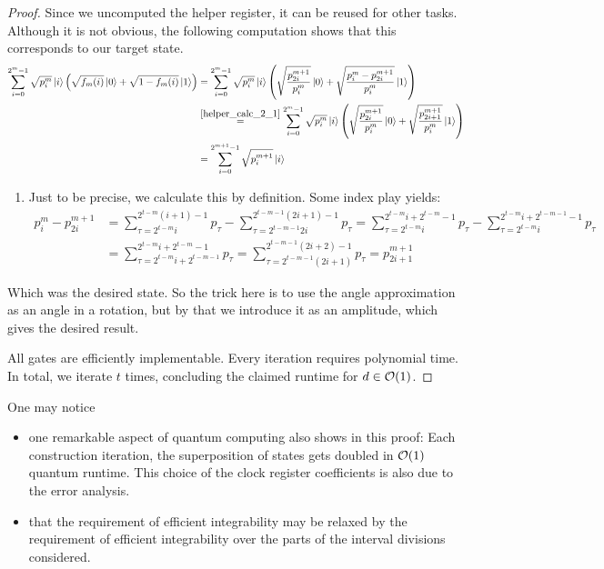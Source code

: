 \begin{proof}
    Since we uncomputed the helper register, it can be reused for other tasks. Although it is not obvious, the following computation shows that this corresponds to our target state.
    \begin{align}
        \sum_{i=0}^{2^m-1}\sqrt{p_i^m}\ket{i}\left(\sqrt{f_m(i)}\ket{0}+\sqrt{1-f_m(i)}\ket{1}\right) &= \sum_{i=0}^{2^m-1}\sqrt{p_i^m}\ket{i}\left(\sqrt{\frac{p_{2i}^{m+1}}{p_i^m}}\ket{0}+\sqrt{\frac{p_i^m-p_{2i}^{m+1}}{p_i^m}}\ket{1}\right)\\
        &\overset{\ref{helper_calc_2_1}}{=} \sum_{i=0}^{2^m-1}\sqrt{p_i^m}\ket{i}\left(\sqrt{\frac{p_{2i}^{m+1}}{p_i^m}}\ket{0}+\sqrt{\frac{p_{2i+1}^{m+1}}{p_i^m}}\ket{1}\right)\\
        &= \sum_{i=0}^{2^{m+1}-1}\sqrt{p_i^{m+1}}\ket{i}
    \end{align}
    \begin{enumerate}[label=(\arabic*)]
        \item \label{helper_calc_2_1} Just to be precise, we calculate this by definition. Some index play yields:
        \begin{align}
            p_i^m-p_{2i}^{m+1} &= \textstyle\sum_{\tau=2^{t-m}i}^{2^{t-m}(i+1)-1} p_\tau - \textstyle\sum_{\tau=2^{t-m-1}2i}^{2^{t-m-1}(2i+1)-1} p_\tau = \textstyle\sum_{\tau=2^{t-m}i}^{2^{t-m}i+2^{t-m}-1} p_\tau - \textstyle\sum_{\tau=2^{t-m}i}^{2^{t-m}i+2^{t-m-1}-1} p_\tau\\
            &= \textstyle\sum_{\tau=2^{t-m}i+2^{t-m-1}}^{2^{t-m}i+2^{t-m}-1} p_\tau = \textstyle\sum_{\tau=2^{t-m-1}(2i+1)}^{2^{t-m-1}(2i+2)-1} p_\tau = p_{2i+1}^{m+1}
        \end{align}
    \end{enumerate}

    Which was the desired state. So the trick here is to use the angle approximation as an angle in a rotation, but by that we introduce it as an amplitude, which gives the desired result.

    All gates are efficiently implementable. Every iteration requires polynomial time. In total, we iterate \(t\) times, concluding the claimed runtime for \(d \in \operatorname{\mathcal{O}}(1)\).
\end{proof}

\begin{remark} One may notice
    \begin{itemize}
        \item one remarkable aspect of quantum computing also shows in this proof: Each construction iteration, the superposition of states gets doubled in \(\operatorname{\mathcal{O}}(1)\) quantum runtime. This choice of the clock register coefficients is also due to the error analysis.
        \item that the requirement of efficient integrability may be relaxed by the requirement of efficient integrability over the parts of the interval divisions considered.
    \end{itemize}
\end{remark}

